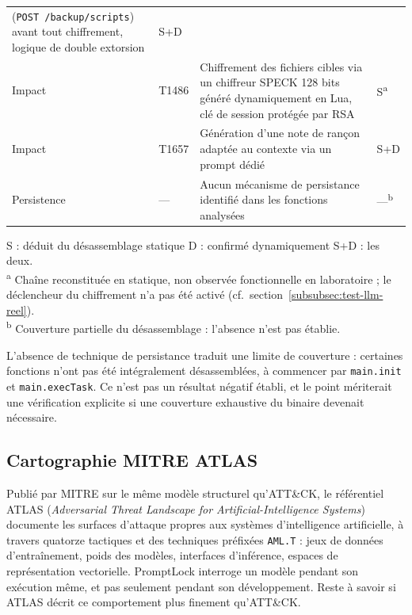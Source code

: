 \begin{table}[htbp]
\begin{tabularx}{\linewidth}{@{}
      >{\RaggedRight\arraybackslash}p{2.7cm}
      >{\ttfamily\RaggedRight\arraybackslash}p{1.9cm}
      >{\RaggedRight\arraybackslash}X
      >{\centering\arraybackslash}p{1.1cm} @{}}
        (\texttt{POST /backup/scripts}) avant tout chiffrement, logique de
        double extorsion
      & S+D \\
    \addlinespace
    Impact
      & T1486
      & Chiffrement des fichiers cibles via un chiffreur SPECK 128 bits
        généré dynamiquement en Lua, clé de session protégée par RSA
      & S\textsuperscript{a} \\
    Impact
      & T1657
      & Génération d'une note de rançon adaptée au contexte via un prompt dédié
      & S+D \\
    \addlinespace
    Persistence
      & \normalfont---
      & Aucun mécanisme de persistance identifié dans les fonctions analysées
      & ---\textsuperscript{b} \\
    \bottomrule
  \end{tabularx}

  \vspace{2pt}
  {\footnotesize\RaggedRight
   S : déduit du désassemblage statique \textbullet{} D : confirmé dynamiquement
   \textbullet{} S+D : les deux.\\
   \textsuperscript{a} Chaîne reconstituée en statique, non observée fonctionnelle
   en laboratoire ; le déclencheur du chiffrement n'a pas été activé
   (cf.\ section~\ref{subsubsec:test-llm-reel}).\\
   \textsuperscript{b} Couverture partielle du désassemblage : l'absence n'est pas
   établie.\par}
\end{table}

L'absence de technique de persistance traduit une limite de couverture : certaines fonctions n'ont pas été intégralement désassemblées, à commencer par \texttt{main.init} et \texttt{main.execTask}. Ce n'est pas un résultat négatif établi, et le point mériterait une vérification explicite si une couverture exhaustive du binaire devenait nécessaire.

\subsection{Cartographie MITRE ATLAS}

Publié par MITRE sur le même modèle structurel qu'ATT\&CK, le référentiel ATLAS
(\emph{Adversarial Threat Landscape for Artificial-Intelligence Systems}) documente les
surfaces d'attaque propres aux systèmes d'intelligence artificielle, à travers quatorze
tactiques et des techniques préfixées \texttt{AML.T} : jeux de données d'entraînement,
poids des modèles, interfaces d'inférence, espaces de représentation vectorielle.
PromptLock interroge un modèle pendant son exécution même, et pas seulement pendant son
développement. Reste à savoir si ATLAS décrit ce comportement plus finement qu'ATT\&CK.

